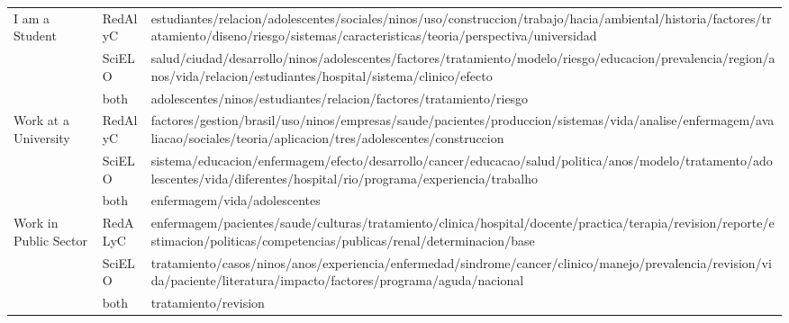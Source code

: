 \begin{longtable}{@{}lp{2.5cm}p{6.5cm}@{}}
\bottomrule
\endlastfoot
I am a Student  &   RedAlyC & estudiantes{\slash}relacion{\slash}adolescentes{\slash}sociales{\slash}ninos{\slash}uso{\slash}construccion{\slash}trabajo{\slash}hacia{\slash}ambiental{\slash}historia{\slash}factores{\slash}tratamiento{\slash}diseno{\slash}riesgo{\slash}sistemas{\slash}caracteristicas{\slash}teoria{\slash}perspectiva{\slash}universidad \\
    &   SciELO  &   salud{\slash}ciudad{\slash}desarrollo{\slash}ninos{\slash}adolescentes{\slash}factores{\slash}tratamiento{\slash}modelo{\slash}riesgo{\slash}educacion{\slash}prevalencia{\slash}region{\slash}anos{\slash}vida{\slash}relacion{\slash}estudiantes{\slash}hospital{\slash}sistema{\slash}clinico{\slash}efecto \\
    &   both    &   adolescentes{\slash}ninos{\slash}estudiantes{\slash}relacion{\slash}factores{\slash}tratamiento{\slash}riesgo \\ \hline
Work at a University    &   RedAlyC &   factores{\slash}gestion{\slash}brasil{\slash}uso{\slash}ninos{\slash}empresas{\slash}saude{\slash}pacientes{\slash}produccion{\slash}sistemas{\slash}vida{\slash}analise{\slash}enfermagem{\slash}avaliacao{\slash}sociales{\slash}teoria{\slash}aplicacion{\slash}tres{\slash}adolescentes{\slash}construccion \\
    &   SciELO  &   sistema{\slash}educacion{\slash}enfermagem{\slash}efecto{\slash}desarrollo{\slash}cancer{\slash}educacao{\slash}salud{\slash}politica{\slash}anos{\slash}modelo{\slash}tratamento{\slash}adolescentes{\slash}vida{\slash}diferentes{\slash}hospital{\slash}rio{\slash}programa{\slash}experiencia{\slash}trabalho \\
    &   both    &   enfermagem{\slash}vida{\slash}adolescentes \\ \hline
Work in Public Sector   &   RedALyC & enfermagem{\slash}pacientes{\slash}saude{\slash}culturas{\slash}tratamiento{\slash}clinica{\slash}hospital{\slash}docente{\slash}practica{\slash}terapia{\slash}revision{\slash}reporte{\slash}estimacion{\slash}politicas{\slash}competencias{\slash}publicas{\slash}renal{\slash}determinacion{\slash}base \\
    &   SciELO  &   tratamiento{\slash}casos{\slash}ninos{\slash}anos{\slash}experiencia{\slash}enfermedad{\slash}sindrome{\slash}cancer{\slash}clinico{\slash}manejo{\slash}prevalencia{\slash}revision{\slash}vida{\slash}paciente{\slash}literatura{\slash}impacto{\slash}factores{\slash}programa{\slash}aguda{\slash}nacional \\
    &   both    &   tratamiento{\slash}revision \\ \hline

\end{longtable}
